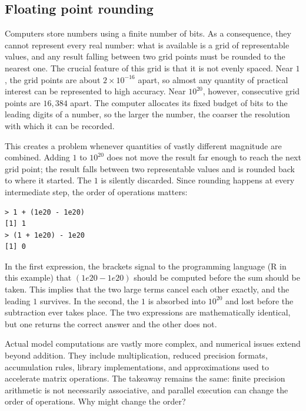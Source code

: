 \documentclass[11pt]{article}
\begin{document}
\subsection{Floating point rounding}

Computers store numbers using a finite number of bits. As a consequence, they cannot represent every real number: what is available is a grid of representable values, and any result falling between two grid points must be rounded to the nearest one. The crucial feature of this grid is that it is not evenly spaced. Near $1$, the grid points are about $2 \times 10^{-16}$ apart, so almost any quantity of practical interest can be represented to high accuracy. Near $10^{20}$, however, consecutive grid points are $16{,}384$ apart. The computer allocates its fixed budget of bits to the leading digits of a number, so the larger the number, the coarser the resolution with which it can be recorded.\medskip

This creates a problem whenever quantities of vastly different magnitude are combined. Adding $1$ to $10^{20}$ does not move the result far enough to reach the next grid point; the result falls between two representable values and is rounded back to where it started. The $1$ is silently discarded. Since rounding happens at every intermediate step, the order of operations matters:

\begin{verbatim}
> 1 + (1e20 - 1e20)
[1] 1
> (1 + 1e20) - 1e20
[1] 0
\end{verbatim}

In the first expression, the brackets signal to the programming language (R in this example) that $(1e20 - 1e20)$ should be computed before the sum should be taken. This implies that the two large terms cancel each other exactly, and the leading $1$ survives. In the second, the $1$ is absorbed into $10^{20}$ and lost before the subtraction ever takes place. The two expressions are mathematically identical, but one returns the correct answer and the other does not.%
\medskip

Actual model computations are vastly more complex, and numerical issues extend beyond addition. They include multiplication, reduced precision formats, accumulation rules, library implementations, and approximations used to accelerate matrix operations. The takeaway remains the same: finite precision arithmetic is not necessarily associative, and parallel execution can change the order of operations. Why might change the order?
\end{document}
